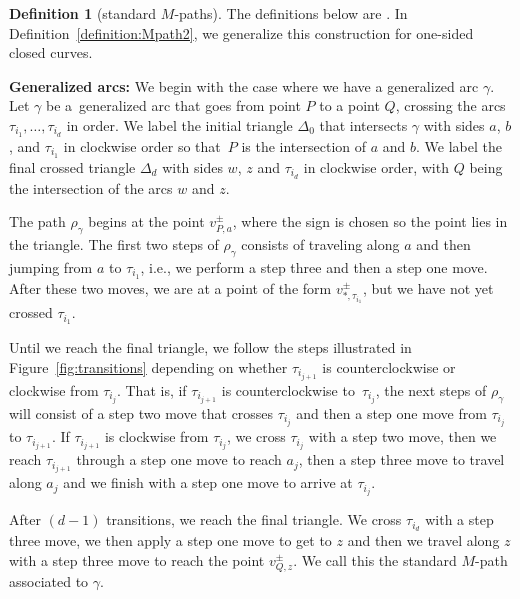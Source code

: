\documentclass[10pt,a4paper]{amsart}
\numberwithin{equation}{section}
\theoremstyle{definition}
\newtheorem{Definition}[Theorem]{Definition}
\begin{document}
\begin{Definition}[standard $M$-paths]\label{definition:Mpath}
The definitions below are \cite[Definitions 5.9 and 5.11]{MW13}. In Definition~\ref{definition:Mpath2}, we generalize this construction for one-sided closed curves.

\textbf{Generalized arcs:} We begin with the case where we have a generalized arc $\gamma$. Let $\gamma$ be a~generalized arc that goes from point $P$ to a point $Q$, crossing the arcs $\tau_{i_1},\ldots,\tau_{i_d}$ in order. We label the initial triangle $\Delta_0$ that intersects $\gamma$ with sides $a$, $b$, and $\tau_{i_1}$ in clockwise order so that~$P$ is the intersection of $a$ and $b$. We label the final crossed triangle $\Delta_d$ with sides $w$, $z$ and $\tau_{i_d}$ in clockwise order, with $Q$ being the intersection of the arcs $w$ and $z$.

The path $\rho_{\gamma}$ begins at the point $v^{\pm}_{P,a}$, where the sign is chosen so the point lies in the triangle. The first two steps of $\rho_{\gamma}$ consists of traveling along $a$ and then jumping from $a$ to $\tau_{i_1}$, i.e., we perform a step three and then a step one move. After these two moves, we are at a point of the form $v^{\pm}_{*, \tau_{i_1}}$, but we have not yet crossed $\tau_{i_1}$.

Until we reach the final triangle, we follow the steps illustrated in Figure~\ref{fig:transitions} depending on whether $\tau_{i_{j+1}}$ is counterclockwise or clockwise from $\tau_{i_j}$. That is, if $\tau_{i_{j+1}}$ is counterclockwise to~$\tau_{i_j}$, the next steps of $\rho_{\gamma}$ will consist of a step two move that crosses $\tau_{i_j}$ and then a step one move from $\tau_{i_j}$ to $\tau_{i_{j+1}}$. If $\tau_{i_{j+1}}$ is clockwise from $\tau_{i_j}$, we cross $\tau_{i_j}$ with a step two move, then we reach $\tau_{i_{j+1}}$ through a step one move to reach $a_j$, then a step three move to travel along $a_j$ and we finish with a step one move to arrive at $\tau_{i_j}$.

After $(d-1)$ transitions, we reach the final triangle. We cross $\tau_{i_d}$ with a step three move, we then apply a step one move to get to $z$ and then we travel along $z$ with a step three move to reach the point $v^{\pm}_{Q, z}$. We call this the standard $M$-path associated to $\gamma$.


\end{Definition}
\end{document}
